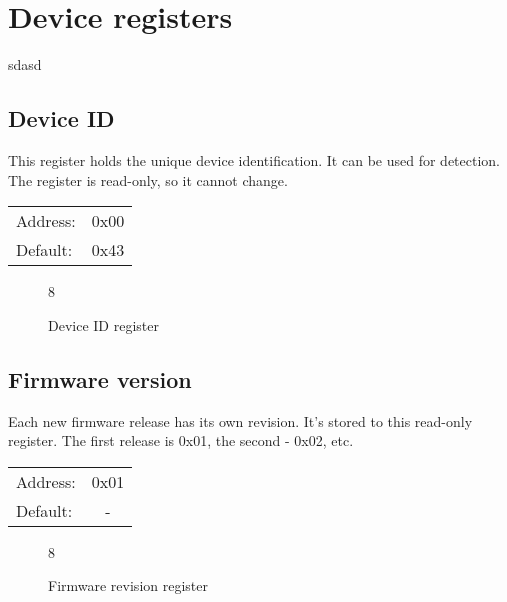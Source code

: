 \documentclass{article}
\begin{document}
	\section{Device registers}
	sdasd

	\subsection{Device ID}

		This register holds the unique device identification. It can be used for detection. The register is read-only, so it cannot change.

		\begin{tabular}{ l c }
			Address: & 0x00 \\
			Default: & 0x43 \\
		\end{tabular}

		\begin{figure}[H]
			\centering
			\begin{bytefield}[
				bitwidth=0.1\linewidth]{8}
				 \\
			\end{bytefield}
			\caption{Device ID register}
			\label{reg:device_id}
		\end{figure}

	\subsection{Firmware version}

		Each new firmware release has its own revision. It's stored to this read-only register.
		The first release is 0x01, the second - 0x02, etc.

		\begin{tabular}{ l c }
			Address: & 0x01 \\
			Default: & - \\
		\end{tabular}

		\begin{figure}[H]
			\centering
			\begin{bytefield}[
				bitwidth=0.1\linewidth]{8}
				\bitheader[endianness=big, bitformatting={\small\bfseries}]{0-7} \\
				\bitbox{8}{FW}
			\end{bytefield}
			\caption{Firmware revision register}
			\label{reg:fw_rev}
		\end{figure}
\end{document}
